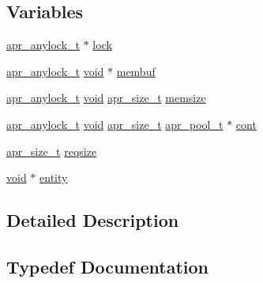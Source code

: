 \subsection*{Variables}
\begin{DoxyCompactItemize}
\item 
\hyperlink{structapr__anylock__t}{apr\+\_\+anylock\+\_\+t} $\ast$ \hyperlink{group__APR__Util__RMM_ga0353fe7d0bd33c38d9a7a57a73b6407e}{lock}
\item 
\hyperlink{structapr__anylock__t}{apr\+\_\+anylock\+\_\+t} \hyperlink{group__MOD__ISAPI_gacd6cdbf73df3d9eed42fa493d9b621a6}{void} $\ast$ \hyperlink{group__APR__Util__RMM_ga8cd1efca8664c2df8d8dbab3bf4b90df}{membuf}
\item 
\hyperlink{structapr__anylock__t}{apr\+\_\+anylock\+\_\+t} \hyperlink{group__MOD__ISAPI_gacd6cdbf73df3d9eed42fa493d9b621a6}{void} \hyperlink{group__apr__platform_gaaa72b2253f6f3032cefea5712a27540e}{apr\+\_\+size\+\_\+t} \hyperlink{group__APR__Util__RMM_gacf427447e8eb4dd9a7238411a3ae120d}{memsize}
\item 
\hyperlink{structapr__anylock__t}{apr\+\_\+anylock\+\_\+t} \hyperlink{group__MOD__ISAPI_gacd6cdbf73df3d9eed42fa493d9b621a6}{void} \hyperlink{group__apr__platform_gaaa72b2253f6f3032cefea5712a27540e}{apr\+\_\+size\+\_\+t} \hyperlink{structapr__pool__t}{apr\+\_\+pool\+\_\+t} $\ast$ \hyperlink{group__APR__Util__RMM_ga787b4ea953862721fc5e2d757cd26cfc}{cont}
\item 
\hyperlink{group__apr__platform_gaaa72b2253f6f3032cefea5712a27540e}{apr\+\_\+size\+\_\+t} \hyperlink{group__APR__Util__RMM_gab0526251505fe7f4db6377b7617e16d9}{reqsize}
\item 
\hyperlink{group__MOD__ISAPI_gacd6cdbf73df3d9eed42fa493d9b621a6}{void} $\ast$ \hyperlink{group__APR__Util__RMM_ga9c332e6ff04da36425a4963b3bd27dd3}{entity}
\end{DoxyCompactItemize}


\subsection{Detailed Description}


\subsection{Typedef Documentation}
